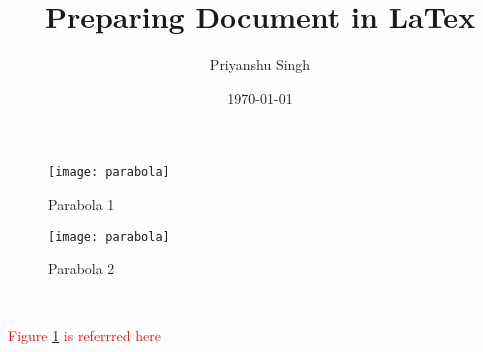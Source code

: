 \documentclass[10pt,twocolumn]{article}
\begin{document}
	\title{Preparing Document in LaTex}
	\author{Priyanshu Singh}
	\date{\today}
	\maketitle
	\blindtext
	\begin{figure*}[h]
		\begin{subfigure}[c]{0.45\textwidth}
			\texttt{[image: parabola]}
			\centering
			\label{1a}
			\begin{flushright}\caption{Parabola 1}\end{flushright}
		\end{subfigure}
		\hfill
		\begin{subfigure}[c]{0.45\textwidth}
			\texttt{[image: parabola]}
			\centering
			\begin{center}\caption{Parabola 2}\end{center}
		\end{subfigure}\\
	\end{figure*}
	\blindtext
	\lipsum
	\textcolor{red}{Figure \ref{1a} is referrred here}
\end{document}
